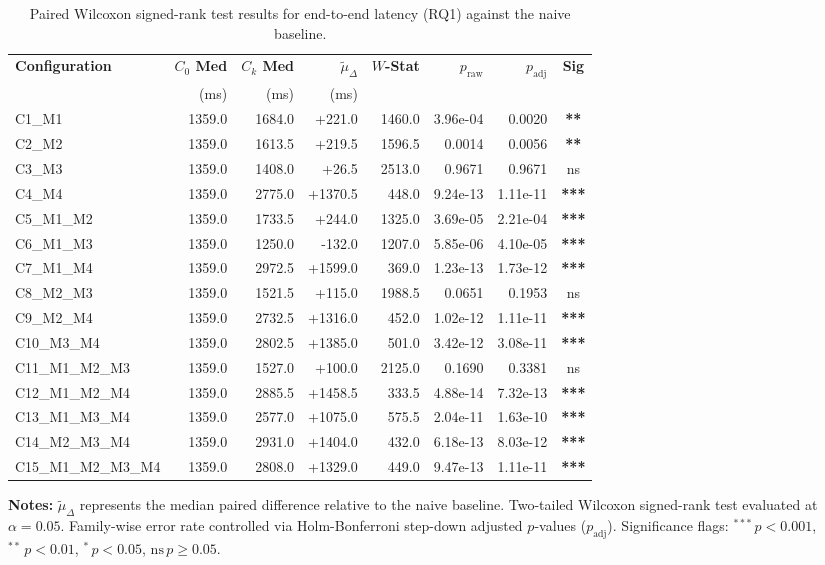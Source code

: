 \begin{table}[!htbp]
\centering
\small
\caption{Paired Wilcoxon signed-rank test results for end-to-end latency (RQ1) against the naive baseline.}
\label{tab:wilcoxon_rq1}
\begin{tabular*}{\textwidth}{@{\extracolsep{\fill}} l r r r r r r c @{}}
\toprule
\textbf{Configuration} & \textbf{$C_0$ Med} & \textbf{$C_k$ Med} & \textbf{$\tilde{\mu}_\Delta$} & \textbf{$W$-Stat} & \textbf{$p_{\text{raw}}$} & \textbf{$p_{\text{adj}}$} & \textbf{Sig} \\
 & \scriptsize{(ms)} & \scriptsize{(ms)} & \scriptsize{(ms)} & & & & \\
\midrule
C1\_M1 & 1359.0 & 1684.0 & +221.0 & 1460.0 & 3.96e-04 & 0.0020 & \textbf{**} \\
C2\_M2 & 1359.0 & 1613.5 & +219.5 & 1596.5 & 0.0014 & 0.0056 & \textbf{**} \\
C3\_M3 & 1359.0 & 1408.0 & +26.5 & 2513.0 & 0.9671 & 0.9671 & ns \\
C4\_M4 & 1359.0 & 2775.0 & +1370.5 & 448.0 & 9.24e-13 & 1.11e-11 & \textbf{***} \\
C5\_M1\_M2 & 1359.0 & 1733.5 & +244.0 & 1325.0 & 3.69e-05 & 2.21e-04 & \textbf{***} \\
C6\_M1\_M3 & 1359.0 & 1250.0 & -132.0 & 1207.0 & 5.85e-06 & 4.10e-05 & \textbf{***} \\
C7\_M1\_M4 & 1359.0 & 2972.5 & +1599.0 & 369.0 & 1.23e-13 & 1.73e-12 & \textbf{***} \\
C8\_M2\_M3 & 1359.0 & 1521.5 & +115.0 & 1988.5 & 0.0651 & 0.1953 & ns \\
C9\_M2\_M4 & 1359.0 & 2732.5 & +1316.0 & 452.0 & 1.02e-12 & 1.11e-11 & \textbf{***} \\
C10\_M3\_M4 & 1359.0 & 2802.5 & +1385.0 & 501.0 & 3.42e-12 & 3.08e-11 & \textbf{***} \\
C11\_M1\_M2\_M3 & 1359.0 & 1527.0 & +100.0 & 2125.0 & 0.1690 & 0.3381 & ns \\
C12\_M1\_M2\_M4 & 1359.0 & 2885.5 & +1458.5 & 333.5 & 4.88e-14 & 7.32e-13 & \textbf{***} \\
C13\_M1\_M3\_M4 & 1359.0 & 2577.0 & +1075.0 & 575.5 & 2.04e-11 & 1.63e-10 & \textbf{***} \\
C14\_M2\_M3\_M4 & 1359.0 & 2931.0 & +1404.0 & 432.0 & 6.18e-13 & 8.03e-12 & \textbf{***} \\
C15\_M1\_M2\_M3\_M4 & 1359.0 & 2808.0 & +1329.0 & 449.0 & 9.47e-13 & 1.11e-11 & \textbf{***} \\
\bottomrule
\end{tabular*}
\vspace{0.5em}
\parbox{\textwidth}{\footnotesize
\textbf{Notes:} $\tilde{\mu}_\Delta$ represents the median paired difference relative to the naive baseline. Two-tailed Wilcoxon signed-rank test evaluated at $\alpha = 0.05$. Family-wise error rate controlled via Holm-Bonferroni step-down adjusted $p$-values ($p_{\text{adj}}$). Significance flags: $^{***}\,p < 0.001$, $^{**}\,p < 0.01$, $^{*}\,p < 0.05$, $\text{ns}\,p \ge 0.05$.}
\end{table}
